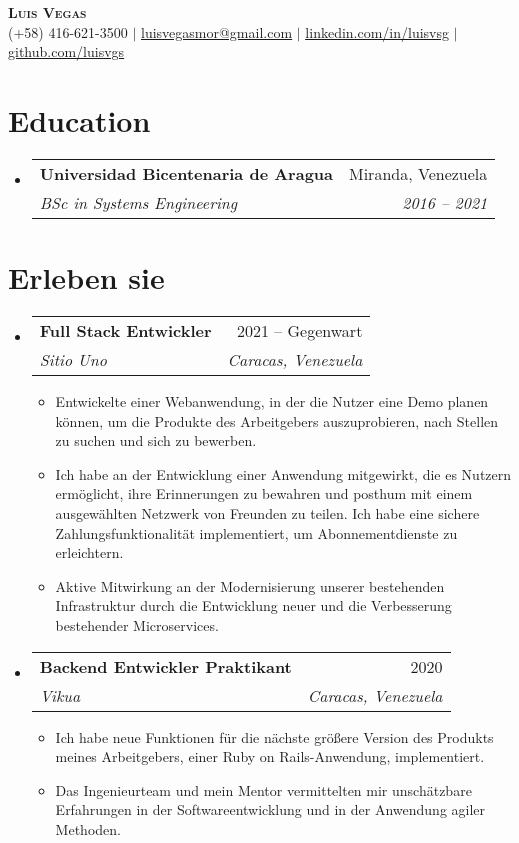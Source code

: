 \documentclass[letterpaper,11pt]{article}
\makeatletter
\newcommand{\resumeItem}[1]{
  \item\small{
    {#1 \vspace{-2pt}}
  }
}
\newcommand{\resumeSubheading}[4]{
  \vspace{-2pt}\item
    \begin{tabular*}{0.97\textwidth}[t]{l@{\extracolsep{\fill}}r}
      \textbf{#1} & #2 \\
      \textit{\small#3} & \textit{\small #4} \\
    \end{tabular*}\vspace{-7pt}
}
\newcommand{\resumeSubHeadingListStart}{\begin{itemize}[leftmargin=0.15in, label={}]}
\newcommand{\resumeSubHeadingListEnd}{\end{itemize}}
\newcommand{\resumeItemListStart}{\begin{itemize}}
\newcommand{\resumeItemListEnd}{\end{itemize}\vspace{-5pt}}
\makeatother
\begin{document}
\begin{center}
    \textbf{\Huge \scshape Luis Vegas} \\ \vspace{1pt}
    \small (+58) 416-621-3500 $|$ \href{mailto:x@x.com}{\underline{luisvegasmor@gmail.com}} $|$
    \href{https://linkedin.com/in/luisvsg}{\underline{linkedin.com/in/luisvsg}} $|$
    \href{https://github.com/luisvgs}{\underline{github.com/luisvgs}}
\end{center}


\section{Education}
  \resumeSubHeadingListStart
    \resumeSubheading
      {Universidad Bicentenaria de Aragua}{Miranda, Venezuela}
      {BSc in Systems Engineering}{2016 -- 2021}
  \resumeSubHeadingListEnd

\section{Erleben sie}
  \resumeSubHeadingListStart

\resumeSubheading
  {Full Stack Entwickler}{2021 -- Gegenwart}
  {Sitio Uno}{Caracas, Venezuela}
  \resumeItemListStart
    \resumeItem{Entwickelte einer Webanwendung, in der die Nutzer eine Demo planen können, um die Produkte des Arbeitgebers auszuprobieren, nach Stellen zu suchen und sich zu bewerben.}
    \resumeItem{Ich habe an der Entwicklung einer Anwendung mitgewirkt, die es Nutzern ermöglicht, ihre Erinnerungen zu bewahren und posthum mit einem ausgewählten Netzwerk von Freunden zu teilen. Ich habe eine sichere Zahlungsfunktionalität implementiert, um Abonnementdienste zu erleichtern.}
    \resumeItem{Aktive Mitwirkung an der Modernisierung unserer bestehenden Infrastruktur durch die Entwicklung neuer und die Verbesserung bestehender Microservices.}
  \resumeItemListEnd

\resumeSubheading
  {Backend Entwickler Praktikant}{2020}
  {Vikua}{Caracas, Venezuela}
  \resumeItemListStart
    \resumeItem{Ich habe neue Funktionen für die nächste größere Version des Produkts meines Arbeitgebers, einer Ruby on Rails-Anwendung, implementiert.}
    \resumeItem{Das Ingenieurteam und mein Mentor vermittelten mir unschätzbare Erfahrungen in der Softwareentwicklung und in der Anwendung agiler Methoden.}
  \resumeItemListEnd

\resumeSubHeadingListEnd
\end{document}
